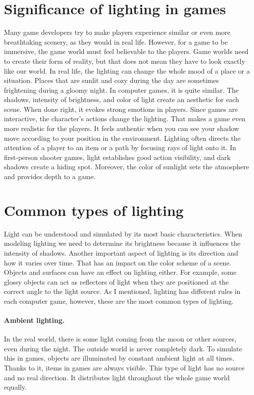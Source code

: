 \documentclass[10pt,twoside,english,a4paper]{article}
\begin{document}
\section{Significance of lighting in games} \label{second}

Many game developers try to make players experience similar or even more breathtaking scenery, as they would in real life. However, for a game to be immersive, the game world must feel believable to the players. Game worlds need to create their form of reality, but that does not mean they have to look exactly like our world. \cite{Oudshoorn:Ray-Tracing} In real life, the lighting can change the whole mood of a place or a situation. Places that are sunlit and cozy during the day are sometimes frightening during a gloomy night. In computer games, it is quite similar. The shadows, intensity of brightness, and color of light create an aesthetic for each scene. When done right, it evokes strong emotions in players. Since games are interactive, the character's actions change the lighting. That makes a game even more realistic for the players. It feels authentic when you can see your shadow move according to your position in the environment. \cite{Pluralsight} Lighting often directs the attention of a player to an item or a path by focusing rays of light onto it. In first-person shooter games, light establishes good action visibility, and dark shadows create a hiding spot. Moreover, the color of sunlight sets the atmosphere and provides depth to a game. \cite{El-Nasr}


\section{Common types of lighting} \label{third}
Light can be understood and simulated by its most basic characteristics. When modeling lighting we need to determine its brightness because it influences the intensity of shadows. Another important aspect of lighting is its direction and how it varies over time. That has an impact on the color scheme of a scene. Objects and surfaces can have an effect on lighting either. For example, some glossy objects can act as reflectors of light when they are positioned at the correct angle to the light source. As I mentioned, lighting has different rules in each computer game, however, these are the most common types of lighting. \cite{Dynamic-Lighting}

\paragraph{Ambient lighting.}
In the real world, there is some light coming from the moon or other sources, even during the night. The outside world is never completely dark. To simulate this in games, objects are illuminated by constant ambient light at all times. Thanks to it, items in games are always visible. This type of light has no source and no real direction. It distributes light throughout the whole game world equally. \cite{Prall}
\end{document}
